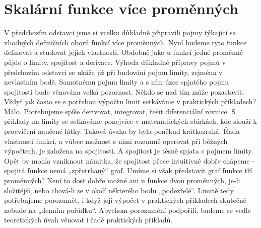   \section{Skalární funkce více proměnných}\label{mai:IIchapVIsecII}
    V předchozím odstavci jsme si vcelku důkladně připravili pojmy týkající se vhodných definičních
    oborů funkcí více proměnných. Nyní budeme tyto funkce definovat a studovat jejich vlastnosti.
    Obdobně jako u funkcí jedné proměnné půjde o limity, spojitost a derivace. Výhoda důkladné
    přípravy pojmů v předchozím odstavci se ukáže již při budování pojmu limity, zejména v
    nevlastním bodě. Samotnému pojmu limity a s ním úzce spjatého pojmu spojitosti bude věnována
    velká pozornost. Někdo se nad tím může pozastavit: Vždyť jak často se s potřebou výpočtu limit
    setkáváme v praktických příkladech? Málo. Potřebujeme spíše derivovat, integrovat, řešit
    diferenciální rovnice. S příklady na limity se setkáváme ponejvíce v matematických sbírkách, kde
    slouží k procvičení naučené látky. Taková úvaha by byla poněkud krátkozraká. Řada vlastností
    funkcí, a vůbec možnost s nimi rozumně operovat při běžných výpočtech, je založena na
    spojitosti. A spojitost je těsně spjata s pojmem limity. Opět by mohla vzniknout námitka, že
    spojitost přece intuitivně dobře chápeme - spojitá funkce nemá „zpřetrhaný“ graf. Umíme si však
    představit graf funkce tří proměnných? Není to dost dobře možné ani u funkce dvou proměnných,
    je-li složitější, nebo chová-li se v okolí některého bodu „podezřelé“. Limitě tedy potřebujeme
    porozumět, i když její výpočet v praktických příkladech skutečně nebude na „denním pořádku“.
    Abychom porozumění podpořili, budeme se vedle teoretických úvah věnovat i řadě praktických
    příkladů.





